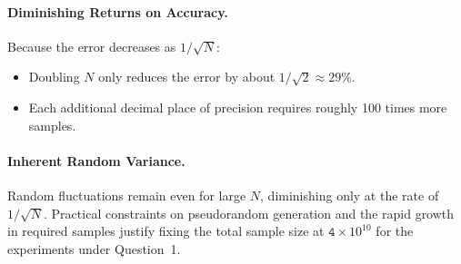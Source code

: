 \documentclass[12pt]{article}
\begin{document}
\paragraph{Diminishing Returns on Accuracy.}
Because the error decreases as \(1/\sqrt{N}\):
\begin{itemize}
      \item Doubling \(N\) only reduces the error by about \(1/\sqrt{2}\approx 29\%\).
      \item Each additional decimal place of precision requires roughly 100 times more
            samples.
\end{itemize}

\paragraph{Inherent Random Variance.}
Random fluctuations remain even for large \(N\), diminishing only at the rate
of \(1/\sqrt{N}\). Practical constraints on pseudorandom generation and the
rapid growth in required samples justify fixing the total sample size at
\(\texttt{4} \times 10^{10}\) for the experiments under Question~1.
\end{document}
